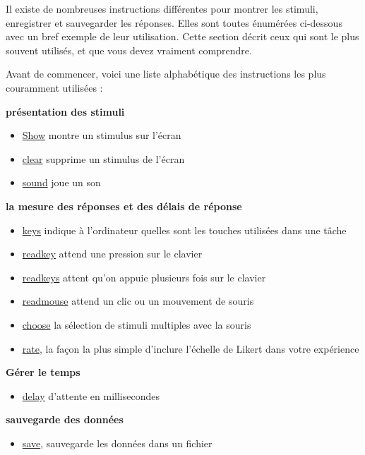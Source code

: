 \documentclass[
]{book}
\providecommand{\tightlist}{%
  \setlength{\itemsep}{0pt}\setlength{\parskip}{0pt}}
\begin{document}
Il existe de nombreuses instructions différentes pour montrer les
stimuli, enregistrer et sauvegarder les réponses. Elles sont toutes
énumérées ci-dessous avec un bref exemple de leur utilisation. Cette
section décrit ceux qui sont le plus souvent utilisés, et que vous devez
vraiment comprendre.

Avant de commencer, voici une liste alphabétique des instructions les
plus couramment utilisées :

\textbf{présentation des stimuli}

\begin{itemize}
\tightlist
\item
  \protect\hyperlink{task-show}{Show} montre un stimulus sur l'écran
\item
  \protect\hyperlink{task-clear}{clear} supprime un stimulus de l'écran
\item
  \protect\hyperlink{task-sound}{sound} joue un son
\end{itemize}

\textbf{la mesure des réponses et des délais de réponse}

\begin{itemize}
\tightlist
\item
  \protect\hyperlink{task-keys}{keys} indique à l'ordinateur quelles
  sont les touches utilisées dans une tâche
\item
  \protect\hyperlink{task-readkey}{readkey} attend une pression sur le
  clavier
\item
  \protect\hyperlink{task-readkeys}{readkeys} attent qu'on appuie
  plusieurs fois sur le clavier
\item
  \protect\hyperlink{task-readkeys}{readmouse} attend un clic ou un
  mouvement de souris
\item
  \protect\hyperlink{task-choose}{choose} la sélection de stimuli
  multiples avec la souris
\item
  \protect\hyperlink{task-rate}{rate}, la façon la plus simple d'inclure
  l'échelle de Likert dans votre expérience
\end{itemize}

\textbf{Gérer le temps}

\begin{itemize}
\tightlist
\item
  \protect\hyperlink{task-delay}{delay} d'attente en millisecondes
\end{itemize}

\textbf{sauvegarde des données}

\begin{itemize}
\tightlist
\item
  \protect\hyperlink{task-save}{save}, sauvegarde les données dans un
  fichier
\end{itemize}
\end{document}
